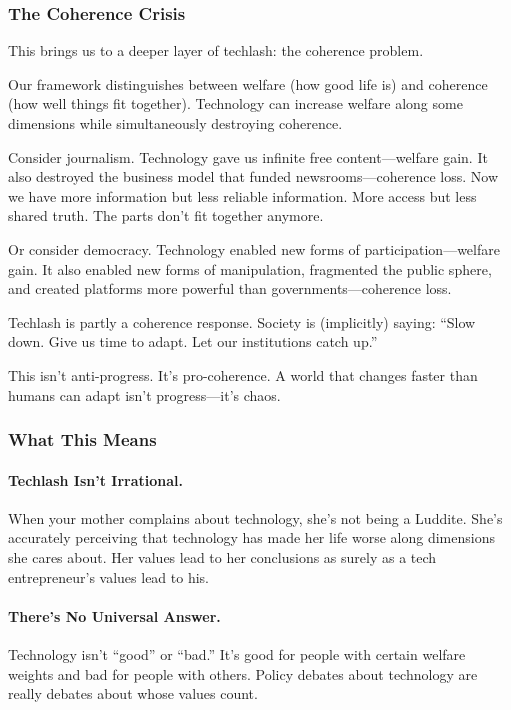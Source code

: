 \subsubsection{The Coherence Crisis}

This brings us to a deeper layer of techlash: the coherence problem.

Our framework distinguishes between welfare (how good life is) and coherence 
(how well things fit together). Technology can increase welfare along some 
dimensions while simultaneously destroying coherence.

Consider journalism. Technology gave us infinite free content---welfare gain. 
It also destroyed the business model that funded newsrooms---coherence loss. 
Now we have more information but less reliable information. More access but 
less shared truth. The parts don't fit together anymore.

Or consider democracy. Technology enabled new forms of participation---welfare 
gain. It also enabled new forms of manipulation, fragmented the public sphere, 
and created platforms more powerful than governments---coherence loss.

Techlash is partly a coherence response. Society is (implicitly) saying: 
``Slow down. Give us time to adapt. Let our institutions catch up.''

This isn't anti-progress. It's pro-coherence. A world that changes faster 
than humans can adapt isn't progress---it's chaos.

\subsubsection{What This Means}

\paragraph{Techlash Isn't Irrational.}

When your mother complains about technology, she's not being a Luddite. 
She's accurately perceiving that technology has made her life worse 
along dimensions she cares about. Her values lead to her conclusions 
as surely as a tech entrepreneur's values lead to his.

\paragraph{There's No Universal Answer.}

Technology isn't ``good'' or ``bad.'' It's good for people with certain 
welfare weights and bad for people with others. Policy debates about 
technology are really debates about whose values count.

